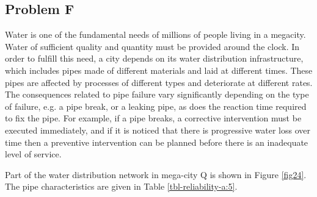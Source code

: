 \subsection{Problem F}
Water is one of the fundamental needs of millions of people living in a
megacity. Water of sufficient quality and quantity must be provided around the
clock. In order to fulfill this need, a city depends on its water distribution
infrastructure, which includes pipes made of different materials and laid at
different times. These pipes are affected by processes of different types and
deteriorate at different rates. The consequences related to pipe failure vary
significantly depending on the type of failure, e.g. a pipe break, or a leaking
pipe, as does the reaction time required to fix the pipe. For example, if a pipe
breaks, a corrective intervention must be executed immediately, and if it is
noticed that there is progressive water loss over time then a preventive
intervention can be planned before there is an inadequate level of service.

Part of the water distribution network in mega-city Q is shown in Figure
\ref{fig24}. The pipe characteristics are given in Table \ref{tbl-reliability-a:5}.

